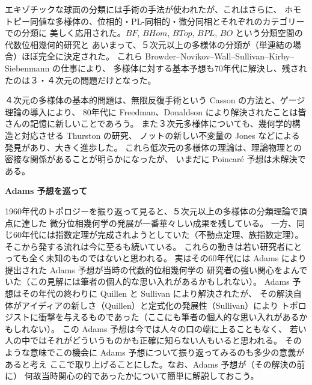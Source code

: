 \documentclass[uplatex,dvipdfmx]{jlreq}
\begin{document}
エキゾチックな球面の分類には手術の手法が使われたが、これはさらに、
ホモトピー同値な多様体の、位相的・PL-同相的・微分同相とそれぞれのカテゴリーでの分類に
美しく応用された。$BF$, $BHom$, $BTop$, $BPL$, $BO$ という分類空間の代数位相幾何的研究と
あいまって、５次元以上の多様体の分類が（単連結の場合）ほぼ完全に決定された。
これら Browder--Novikov--Wall--Sullivan--Kirby--Siebenmann の仕事により、
多様体に対する基本予想も70年代に解決し、残されたのは３・４次元の問題だけとなった。

４次元の多様体の基本的問題は、無限反復手術という Casson の方法と、ゲージ理論の導入により、
80年代に Freedman、Donaldson により解決されたことは皆さんの記憶に新しいことであろう。
また３次元多様体についても、幾何学的構造と対応させる Thurston の研究、
ノットの新しい不変量の Jones などによる発見があり、大きく進歩した。
これら低次元の多様体の理論は、理論物理との密接な関係があることが明らかになったが、
いまだに Poincaré 予想は未解決である。

\newpage

\begin{center}
{\large\bfseries Adams 予想を巡って}

\hspace*{\fill}{\large\bfseries 服部 晶夫（明大・理工）}
\end{center}

\medskip

1960年代のトポロジーを振り返って見ると、５次元以上の多様体の分類理論で頂点に達した
微分位相幾何学の発展が一番華々しい成果を残している。
一方、同じ60年代には指数定理が完成されようとしていた（不動点定理、族指数定理）。
そこから発する流れは今に至るも続いている。
これらの動きは若い研究者にとっても全く未知のものではないと思われる。
実はその60年代には Adams により提出された Adams 予想が当時の代数的位相幾何学の
研究者の強い関心をよんでいた（この見解には筆者の個人的な思い入れがあるかもしれない）。
Adams 予想はその年代の終わりに Quillen と Sullivan により解決されたが、
その解決自体がアイディアの新しさ（Quillen）と定式化の発展性（Sullivan）により
トポロジストに衝撃を与えるものであった（ここにも筆者の個人的な思い入れがあるかもしれない）。
この Adams 予想は今では人々の口の端に上ることもなく、
若い人の中ではそれがどういうものかも正確に知らない人もいると思われる。
そのような意味でこの機会に Adams 予想について振り返ってみるのも多少の意義があると考え
ここで取り上げることにした。なお、Adams 予想が（その解決の前に）
何故当時関心の的であったかについて簡単に解説しておこう。
\end{document}

